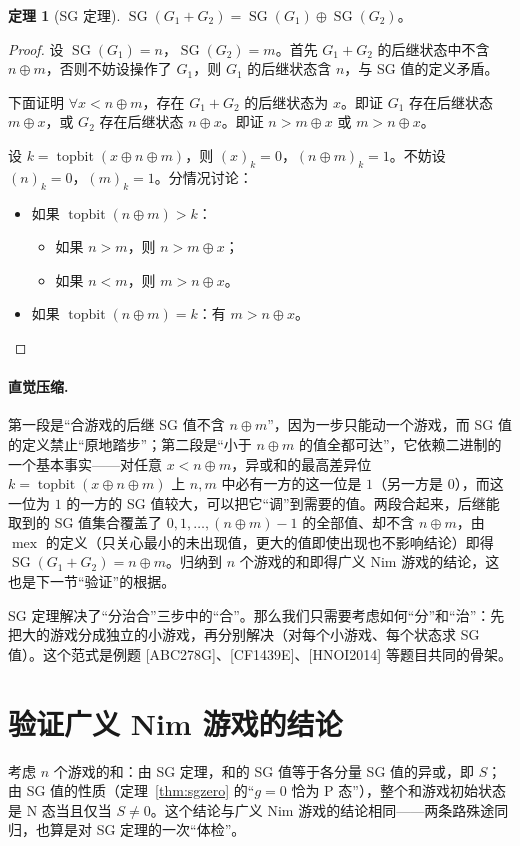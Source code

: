 \documentclass[UTF8,a4paper,11pt,oneside,openany,fontset=fandol]{ctexbook}
\theoremstyle{definition}
\newtheorem{theorem}[definition]{定理}
\newcommand{\mex}{\operatorname{mex}}
\newcommand{\SG}{\operatorname{SG}}
\newcommand{\topbit}{\operatorname{topbit}}
\begin{document}
\begin{theorem}[SG 定理]\label{thm:sgtheorem}
$\SG(G_1+G_2)=\SG(G_1)\oplus\SG(G_2)$。
\end{theorem}
\begin{proof}
设 $\SG(G_1)=n$，$\SG(G_2)=m$。首先 $G_1+G_2$ 的后继状态中不含 $n\oplus m$，否则不妨设操作了 $G_1$，则 $G_1$ 的后继状态含 $n$，与 SG 值的定义矛盾。

下面证明 $\forall x<n\oplus m$，存在 $G_1+G_2$ 的后继状态为 $x$。即证 $G_1$ 存在后继状态 $m\oplus x$，或 $G_2$ 存在后继状态 $n\oplus x$。即证 $n>m\oplus x$ 或 $m>n\oplus x$。

设 $k=\topbit(x\oplus n\oplus m)$，则 $(x)_k=0$，$(n\oplus m)_k=1$。不妨设 $(n)_k=0$，$(m)_k=1$。分情况讨论：
\begin{itemize}
\item 如果 $\topbit(n\oplus m)>k$：
\begin{itemize}
\item 如果 $n>m$，则 $n>m\oplus x$；
\item 如果 $n<m$，则 $m>n\oplus x$。
\end{itemize}
\item 如果 $\topbit(n\oplus m)=k$：有 $m>n\oplus x$。
\end{itemize}
\end{proof}

\paragraph{直觉压缩.} 第一段是“合游戏的后继 SG 值不含 $n\oplus m$”，因为一步只能动一个游戏，而 SG 值的定义禁止“原地踏步”；第二段是“小于 $n\oplus m$ 的值全都可达”，它依赖二进制的一个基本事实——对任意 $x<n\oplus m$，异或和的最高差异位 $k=\topbit(x\oplus n\oplus m)$ 上 $n,m$ 中必有一方的这一位是 $1$（另一方是 $0$），而这一位为 $1$ 的一方的 SG 值较大，可以把它“调”到需要的值。两段合起来，后继能取到的 SG 值集合覆盖了 $0,1,\ldots,(n\oplus m)-1$ 的全部值、却不含 $n\oplus m$，由 $\mex$ 的定义（只关心最小的未出现值，更大的值即使出现也不影响结论）即得 $\SG(G_1+G_2)=n\oplus m$。归纳到 $n$ 个游戏的和即得广义 Nim 游戏的结论，这也是下一节“验证”的根据。

SG 定理解决了“分治合”三步中的“合”。那么我们只需要考虑如何“分”和“治”：先把大的游戏分成独立的小游戏，再分别解决（对每个小游戏、每个状态求 SG 值）。这个范式是例题 [ABC278G]、[CF1439E]、[HNOI2014] 等题目共同的骨架。

\section{验证广义 Nim 游戏的结论}
考虑 $n$ 个游戏的和：由 SG 定理，和的 SG 值等于各分量 SG 值的异或，即 $S$；由 SG 值的性质（定理~\ref{thm:sgzero} 的“$g=0$ 恰为 P 态”），整个和游戏初始状态是 N 态当且仅当 $S\ne0$。这个结论与广义 Nim 游戏的结论相同——两条路殊途同归，也算是对 SG 定理的一次“体检”。
\end{document}
